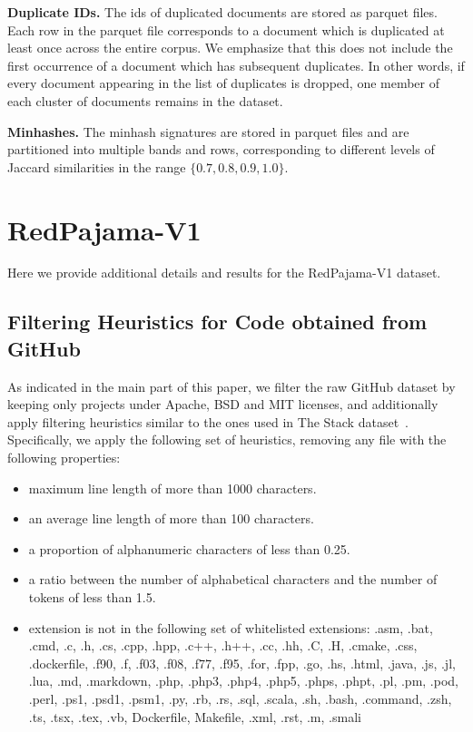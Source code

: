\documentclass{article}
\begin{document}
{\bf Duplicate IDs.} The ids of duplicated documents are stored as parquet files. Each row in the parquet file corresponds to a document which is duplicated at least once across the entire corpus. We emphasize that this does not include the first occurrence of a document which has subsequent duplicates. In other words, if every document appearing in the list of duplicates is dropped, one member of each cluster of documents remains in the dataset.

{\bf Minhashes.} The minhash signatures are stored in parquet files and are partitioned into multiple bands and rows, corresponding to different levels of Jaccard similarities in the range $\{0.7, 0.8, 0.9, 1.0\}$.

\section{RedPajama-V1}
\label{sec:apx-rpv1}
Here we provide additional details and results for the RedPajama-V1 dataset.
\subsection{Filtering Heuristics for Code obtained from GitHub}
As indicated in the main part of this paper, we filter the raw GitHub dataset by keeping only projects under Apache, BSD and MIT licenses, and additionally apply filtering heuristics similar to the ones used in The Stack dataset~\cite{Kocetkov2022TheStack}. Specifically, we apply the following set of heuristics, removing any file with the following properties:
\begin{itemize}
    \item maximum line length of more than 1000 characters.
    \item an average line length of more than 100 characters.
    \item a proportion of alphanumeric characters of less than 0.25.
    \item a ratio between the number of alphabetical characters and the number of tokens of less than 1.5.
    \item extension is not in the following set of whitelisted extensions:
    .asm, .bat, .cmd, .c, .h, .cs, .cpp, .hpp, .c++, .h++, .cc, .hh, .C, .H, .cmake, .css,
    .dockerfile, .f90, .f, .f03, .f08, .f77, .f95, .for, .fpp, .go, .hs, .html, .java, .js,
    .jl, .lua, .md, .markdown, .php, .php3, .php4, .php5, .phps, .phpt, .pl, .pm, .pod, .perl,
    .ps1, .psd1, .psm1, .py, .rb, .rs, .sql, .scala, .sh, .bash, .command, .zsh, .ts, .tsx,
    .tex, .vb, Dockerfile, Makefile, .xml, .rst, .m, .smali
\end{itemize}
\end{document}
